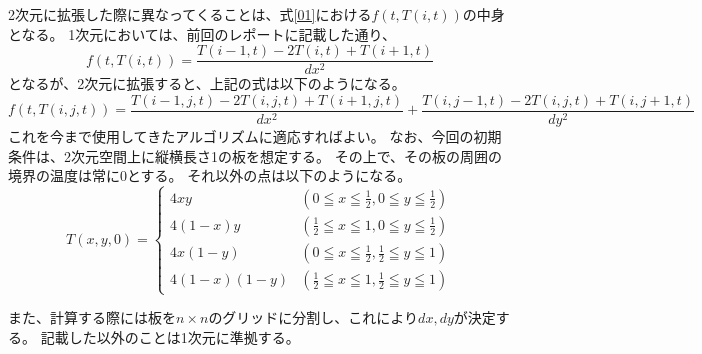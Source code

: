 \documentclass{jsarticle}
\begin{document}
2次元に拡張した際に異なってくることは、式\ref{01}における$f(t, T(i,t))$の中身となる。
1次元においては、前回のレポートに記載した通り、
\begin{equation}
	f(t, T(i,t)) = \frac{T(i-1,t) - 2T(i,t) + T(i+1,t)}{dx^2}	\label{06}
\end{equation}
となるが、2次元に拡張すると、上記の式は以下のようになる。
\begin{equation}
	f(t, T(i,j,t)) = \frac{T(i-1,j,t) - 2T(i,j,t) + T(i+1,j,t)}{dx^2} + \frac{T(i,j-1,t) - 2T(i,j,t) + T(i,j+1,t)}{dy^2}
	\label{07}
\end{equation}
これを今まで使用してきたアルゴリズムに適応すればよい。
なお、今回の初期条件は、2次元空間上に縦横長さ1の板を想定する。
その上で、その板の周囲の境界の温度は常に0とする。
それ以外の点は以下のようになる。
\begin{equation}
	\label{08}
	T(x,y,0) = \begin{cases}
		4xy & (0 \leqq x \leqq \frac{1}{2}, 0 \leqq y \leqq \frac{1}{2}) \\
		4(1-x)y & (\frac{1}{2} \leqq x \leqq 1, 0 \leqq y \leqq \frac{1}{2}) \\
		4x(1-y) & (0 \leqq x \leqq \frac{1}{2}, \frac{1}{2} \leqq y \leqq 1) \\
		4(1-x)(1-y) & (\frac{1}{2} \leqq x \leqq 1, \frac{1}{2} \leqq y \leqq 1)
	\end{cases}
\end{equation}

また、計算する際には板を$n\times n$のグリッドに分割し、これにより$dx, dy$が決定する。
記載した以外のことは1次元に準拠する。
\end{document}
